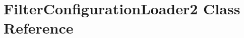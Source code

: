 \hypertarget{classUtility_1_1FilterConfigurationLoader2}{}\section{Filter\+Configuration\+Loader2 Class Reference}
\label{classUtility_1_1FilterConfigurationLoader2}
